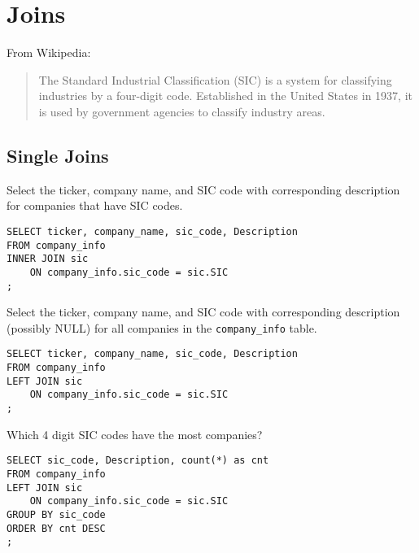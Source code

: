 \documentclass[10pt]{exam}
\begin{document}
\section{Joins}

From Wikipedia:

    \begin{quote}
        The Standard Industrial Classification (SIC) is a system for
        classifying industries by a four-digit code. Established in the
        United States in 1937, it is used by government agencies to
        classify industry areas.
    \end{quote}

\begin{questions}

\subsection*{Single Joins}

\question Select the ticker, company name, and SIC code with corresponding description for
    companies that have SIC codes.

\begin{solution}
\begin{lstlisting}
SELECT ticker, company_name, sic_code, Description
FROM company_info
INNER JOIN sic
    ON company_info.sic_code = sic.SIC
;
\end{lstlisting}
\end{solution}


\question Select the ticker, company name, and SIC code with corresponding
    description (possibly NULL) for
    all companies in the \texttt{company\_info} table. 

\begin{solution}
\begin{lstlisting}
SELECT ticker, company_name, sic_code, Description
FROM company_info
LEFT JOIN sic
    ON company_info.sic_code = sic.SIC
;
\end{lstlisting}
\end{solution}

\question Which 4 digit SIC codes have the most companies?

\begin{solution}
\begin{lstlisting}
SELECT sic_code, Description, count(*) as cnt
FROM company_info
LEFT JOIN sic
    ON company_info.sic_code = sic.SIC
GROUP BY sic_code
ORDER BY cnt DESC
;
\end{lstlisting}
\end{solution}


\end{questions}
\end{document}
